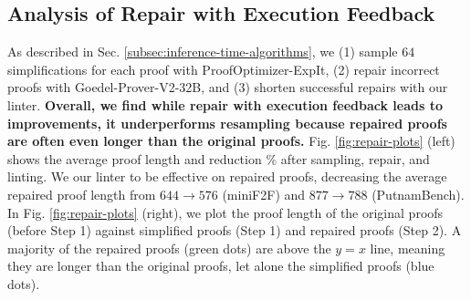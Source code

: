 %
%

\subsection{Analysis of Repair with Execution Feedback} \label{subsec:goedel-repair}
As described in Sec. \ref{subsec:inference-time-algorithms}, we (1) sample $64$ simplifications for each proof with ProofOptimizer-ExpIt, (2) repair incorrect proofs with Goedel-Prover-V2-32B, and (3) shorten successful repairs with our linter. \textbf{Overall, we find while repair with execution feedback leads to improvements, it underperforms resampling because repaired proofs are often even longer than the original proofs.} Fig. \ref{fig:repair-plots} (left) shows the average proof length and reduction \% after sampling, repair, and linting. We our linter to be effective on repaired proofs, decreasing the average repaired proof length from $644 \to 576$ (miniF2F) and $877 \to 788$ (PutnamBench). In Fig. \ref{fig:repair-plots} (right), we plot the proof length of the original proofs (before Step 1) against simplified proofs (Step 1) and repaired proofs (Step 2). A majority of the repaired proofs (green dots) are above the $y=x$ line, meaning they are longer than the original proofs, let alone the simplified proofs (blue dots). 


